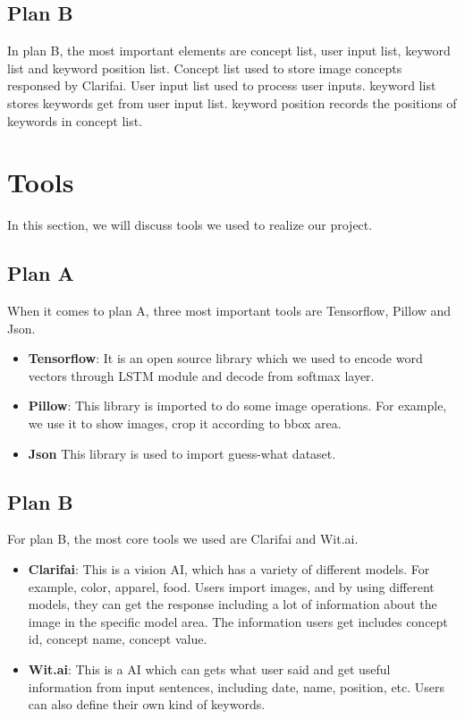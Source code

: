 \documentclass[11pt,a4paper]{article}
\begin{document}
\subsection{Plan B}

In plan B, the most important elements are concept list, user input list, keyword list and keyword position list. Concept list used to store image concepts responsed by Clarifai. User input list used to process user inputs. keyword list stores keywords get from user input list. keyword position records the positions of keywords in concept list. 


\section{Tools}
\label{ssec:first}

In this section, we will discuss tools we used to realize our project. 


\subsection{Plan A}

When it comes to plan A, three most important tools are Tensorflow, Pillow and Json.
\begin{itemize}
\item {\bf Tensorflow}: It is an open source library which we used to encode word vectors through LSTM module and decode from softmax layer.
\item {\bf Pillow}: This library is imported to do some image operations. For example, we use it to show images, crop it according to bbox area.
\item {\bf Json} This library is used to import guess-what dataset.
\end{itemize}


\subsection{Plan B}

For plan B, the most core tools we used are Clarifai and Wit.ai.
\begin{itemize}
\item {\bf Clarifai}: This is a vision AI, which has a variety of different models. For example, color, apparel, food. Users import images, and by using different models, they can get the response including a lot of information about the image in the specific model area. The information users get includes concept id, concept name, concept value.
\item {\bf Wit.ai}: This is a AI which can gets what user said and get useful information from input sentences, including date, name, position, etc. Users can also define their own kind of keywords.
\end{itemize}
\end{document}
